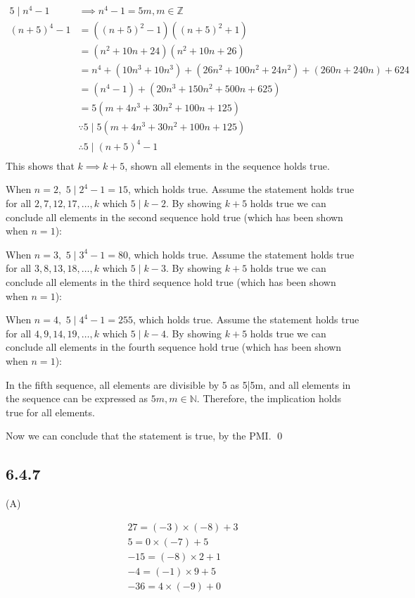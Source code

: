 \documentclass{article}
\begin{document}
\begin{align*}
    5\mid n^4-1&\implies n^4-1=5m,m\in\mathbb{Z}\\
    (n+5)^4-1&=((n+5)^2-1)((n+5)^2+1)\\
    &=(n^2+10n+24)(n^2+10n+26)\\
    &=n^4+(10n^3+10n^3)+(26n^2+100n^2+24n^2)+(260n+240n)+624\\
    &=(n^4-1)+(20n^3+150n^2+500n+625)\\
    &=5(m+4n^3+30n^2+100n+125)\\
    &\because 5\mid5(m+4n^3+30n^2+100n+125)\\
    &\therefore 5\mid (n+5)^4-1\\
\end{align*}
This shows that $k\implies k+5$, shown all elements in the sequence holds true.

When $n=2,$ $5\mid2^4-1=15$, which holds true. Assume the statement holds true for all $2,7,12,17,\ldots,k$ which $5\mid k-2$. By showing $k+5$ holds true we can conclude all elements in the second sequence hold true (which has been shown when $n=1$):

When $n=3,$ $5\mid3^4-1=80$, which holds true. Assume the statement holds true for all $3,8,13,18,\ldots,k$ which $5\mid k-3$. By showing $k+5$ holds true we can conclude all elements in the third sequence hold true (which has been shown when $n=1$):

When $n=4,$ $5\mid4^4-1=255$, which holds true. Assume the statement holds true for all $4,9,14,19,\ldots,k$ which $5\mid k-4$. By showing $k+5$ holds true we can conclude all elements in the fourth sequence hold true (which has been shown when $n=1$):

In the fifth sequence, all elements are divisible by 5 as 5|5m, and all elements in the sequence can be expressed as $5m,m\in\mathbb{N}.$ Therefore, the implication holds true for all elements.

Now we can conclude that the statement is true, by the PMI. \qed

\subsection*{6.4.7}

(A)

\begin{gather*}
    27=(-3)\times (-8) + 3\\
    5=0\times (-7)+5\\
    -15=(-8)\times 2+1\\
    -4=(-1)\times 9+5\\
    -36=4\times(-9)+0
\end{gather*}
\end{document}
